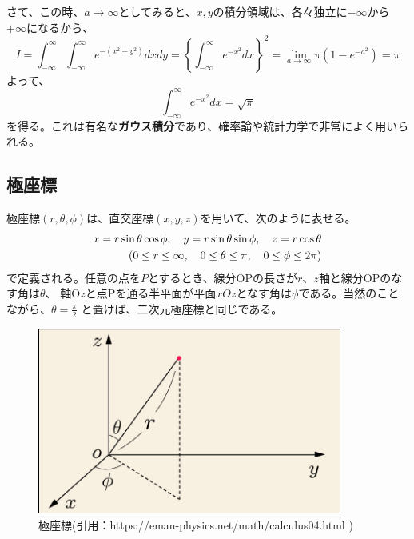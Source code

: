 \documentclass[a4j,dvipdfmx]{jsarticle}
\begin{document}
さて、この時、$a\to\infty$としてみると、$x,y$の積分領域は、各々独立に$-\infty$から$+\infty$になるから、
\begin{equation*}
    I=\int_{-\infty}^{\infty}\int_{-\infty}^{\infty} e^{-(x^2+y^2)}dxdy=\left\{\int_{-\infty}^{\infty}e^{-x^2}dx\right\}^2
    =\lim_{a\to\infty}\pi(1-e^{-a^2})=\pi
\end{equation*}
よって、
\begin{equation}
    \int_{-\infty}^{\infty}e^{-x^2}dx=\sqrt{\pi}\label{6.21}
\end{equation}
を得る。これは有名な\textbf{ガウス積分}であり、確率論や統計力学で非常によく用いられる。

\subsection{極座標}
極座標$(r,\theta,\phi)$は、直交座標$(x,y,z)$を用いて、次のように表せる。
\begin{align}
    x=r\sin\theta\cos\phi,\quad y=r\sin\theta\sin\phi,\quad z=r\cos\theta\notag\\
    (0\leq r\leq\infty,\quad 0\leq\theta\leq\pi,\quad 0\leq\phi\leq 2\pi)\label{6.25}
\end{align}
で定義される。任意の点を$P$とするとき、線分OPの長さが$r$、$z$軸と線分OPのなす角は$\theta$、
軸O$z$と点Pを通る半平面が平面$xOz$となす角は$\phi$である。当然のことながら、$\displaystyle\theta=\frac{\pi}{2}$
と置けば、二次元極座標と同じである。
\begin{figure}[h]
    \centering
    \includegraphics[width=10cm,scale=5]{img/calculus4c.png}
    \caption{極座標(引用：https://eman-physics.net/math/calculus04.html )}
\end{figure}
\end{document}
